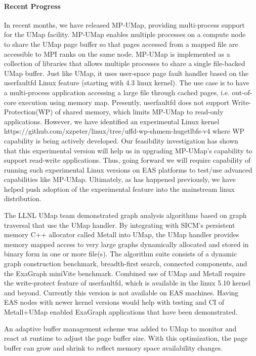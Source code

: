 \paragraph{Recent Progress}

In recent months, we have released MP-UMap, providing multi-process
support for the UMap facility. MP-UMap enables multiple processes on a
compute node to share the UMap page buffer so that pages accessed from
a mapped file are accessible to MPI ranks on the same node. MP-UMap is
implemented as 
a collection of libraries that allows multiple processes to share a
single file-backed UMap buffer. Just like UMap, it uses user-space
page fault handler based on the userfaultfd Linux feature (starting
with 4.3 linux kernel). The use case is to have a multi-process
application accessing a large file through cached pages,
i.e. out-of-core execution using memory map. Presently, userfaultfd
does not support Write-Protection(WP) of shared memory, which limits
MP-UMap to read-only applications. However, we have identified an
experimental Linux kernel
https://github.com/xzpeter/linux/tree/uffd-wp-shmem-hugetlbfs-v4 where
WP capability is being actively developed. Our feasibility
investigation has shown that this experimental version will help us in
upgrading MP-UMap's capability to support read-write
applications. Thus, going forward we will require capability of
running such experimental Linux versions on EAS platforms to test/use
advanced capabilities like MP-UMap. Ultimately, as has happened
previously, we have helped push adoption of the experimental feature
into the mainstream linux distribution.

The LLNL UMap team demonstrated graph analysis algorithms based on
graph traversal that use the UMap handler.  By integrating with SICM’s
persistent memory C++ allocator called Metall into UMap, the UMap
handler provides memory mapped access to very large graphs dynamically
allocated and stored in binary form in one or more file(s). The
algorithm suite consists of a dynamic graph construction benchmark,
breadth-first search, connected components, and the ExaGraph miniVite
benchmark. Combined use of UMap and Metall require the write-protect
feature of userfaultfd, which is available in the linux 5.10 kernel
and beyond. Currently this version is not available on EAS
machines. Having EAS nodes with newer kernel versions would help with
testing and CI of Metall+UMap enabled ExaGraph applications that have
been demonstrated.

An adaptive buffer management scheme was added to UMap to monitor and
react at runtime to adjust the page buffer size. With this
optimization, the page buffer can grow and shrink to reflect memory
space availability changes.

